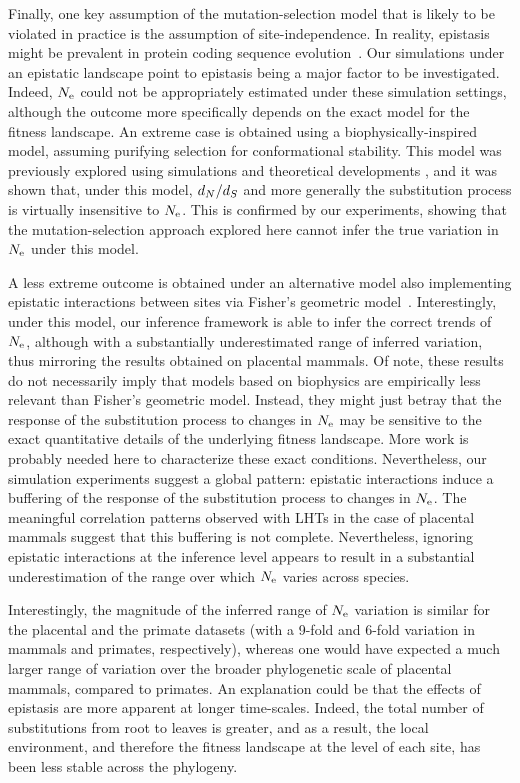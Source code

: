 \documentclass{article}
\begin{document}
    Finally, one key assumption of the mutation-selection model that is likely to be violated in practice is the assumption of site-independence.
    In reality, epistasis might be prevalent in protein coding sequence evolution~\citep{Pollock2014,Shah2015}.
    Our simulations under an epistatic landscape point to epistasis being a major factor to be investigated.
    Indeed, $N_{\text{e}}$ could not be appropriately estimated under these simulation settings, although the outcome more specifically depends on the exact model for the fitness landscape.
    An extreme case is obtained using a biophysically-inspired model, assuming purifying selection for conformational stability.
    This model was previously explored using simulations and theoretical developments \citet{Goldstein2013}, and it was shown that, under this model, $d_N / d_S$ and more generally the {substitution} process is virtually insensitive to $N_{\text{e}}$.
    This is confirmed by our experiments, showing that the mutation-selection approach explored here cannot infer the true variation in $N_{\text{e}}$ under this model.

    A less extreme outcome is obtained under an alternative model also implementing epistatic interactions between sites via Fisher’s geometric model~\citep{Tenaillon2014,Blanquart2016}.
    Interestingly, under this model, our inference framework is able to infer the correct trends of $N_{\text{e}}$, although with a substantially underestimated range of inferred variation, thus mirroring the results obtained on placental mammals.
    Of note, these results do not necessarily imply that models based on biophysics are empirically less relevant than Fisher’s geometric model.
    Instead, they might just betray that the response of the {substitution} process to changes in $N_{\text{e}}$ may be sensitive to the exact quantitative details of the underlying fitness landscape.
    More work is probably needed here to characterize these exact conditions.
    Nevertheless, our simulation experiments suggest a global pattern: epistatic interactions induce a buffering of the response of the {substitution} process to changes in $N_{\text{e}}$.
    The meaningful correlation patterns observed with {LHT}s in the case of placental mammals suggest that this buffering is not complete.
    Nevertheless, ignoring epistatic interactions at the inference level appears to result in a substantial underestimation of the range over which $N_{\text{e}}$ varies across species.

    Interestingly, the magnitude of the inferred range of $N_{\text{e}}$ variation is similar for the placental and the primate datasets (with a 9-fold and 6-fold variation in mammals and primates, respectively), whereas one would have expected a much larger range of variation over the broader phylogenetic scale of placental mammals, compared to primates.
    An explanation could be that the effects of epistasis are more apparent at longer time-scales.
    Indeed, the total number of substitutions from root to leaves is greater, and as a result, the local environment, and therefore the fitness landscape at the level of each site, has been less stable across the phylogeny.
\end{document}
